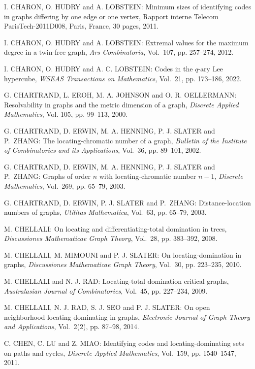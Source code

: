 \begin{thebibliography}{999}
I. CHARON, O. HUDRY and A. LOBSTEIN: Minimum sizes of identifying codes in graphs differing by one edge or one vertex, Rapport interne Telecom ParisTech-2011D008, Paris, France, 30 pages, 2011.

I. CHARON, O. HUDRY and A. LOBSTEIN: Extremal values for the maximum degree in a twin-free graph, {\it Ars Combinatoria}, Vol.~107, pp. 257--274, 2012.

I. CHARON, O. HUDRY and A. C. LOBSTEIN: Codes in the $q$-ary Lee hypercube, {\it WSEAS Transactions on Mathematics}, Vol.~21, pp. 173--186, 2022.

G. CHARTRAND, L. EROH, M. A. JOHNSON and O. R. OELLERMANN: Resolvability in graphs and the metric dimension of a graph, {\it Discrete Applied Mathematics}, Vol. 105, pp. 99--113, 2000.

G. CHARTRAND, D. ERWIN, M. A. HENNING, P. J. SLATER and P.~ZHANG: The locating-chromatic number of a graph, {\it Bulletin of the Institute of Combinatorics and its Applications}, Vol.~36, pp. 89--101, 2002.

G. CHARTRAND, D. ERWIN, M. A. HENNING, P. J. SLATER and P.~ZHANG: Graphs of order $n$ with locating-chromatic number $n-1$, {\it Discrete Mathematics}, Vol.~269, pp. 65--79, 2003.

G. CHARTRAND, D. ERWIN, P. J. SLATER and P.~ZHANG: Distance-location numbers of graphs, {\it Utilitas Mathematica}, Vol.~63, pp. 65--79, 2003.

M. CHELLALI: On locating and differentiating-total domination in trees, {\it Discussiones Mathematicae Graph Theory}, Vol.~28, pp. 383--392, 2008.

M. CHELLALI, M. MIMOUNI and P. J. SLATER: On locating-domination in graphs, {\it
Discussiones Mathematicae Graph Theory}, Vol.~30, pp. 223--235, 2010.

M. CHELLALI and N. J. RAD: Locating-total domination critical graphs, {\it Australasian Journal of Combinatorics}, Vol.~45, pp. 227--234, 2009.

M. CHELLALI, N. J. RAD, S. J. SEO and P. J. SLATER: On open neighborhood locating-dominating in graphs, {\it Electronic Journal of Graph Theory and Applications}, Vol.~2(2), pp. 87--98, 2014.

C. CHEN, C. LU and Z. MIAO: Identifying codes and locating-dominating sets on paths and cycles, {\it Discrete Applied Mathematics}, Vol.~159, pp. 1540--1547, 2011.


\end{thebibliography}
